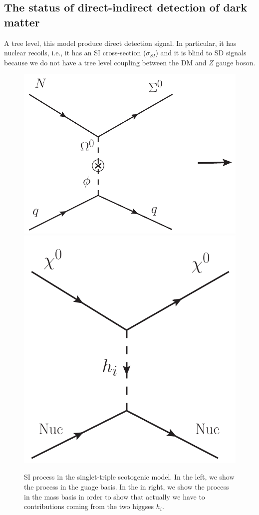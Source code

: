 \documentclass[12pt,letterpaper]{article}
\begin{document}
\subsection{The status of direct-indirect detection of dark matter }
\label{sec:indirect-direct-detection}
A tree level, this model produce direct detection signal. In particular, it has nuclear recoils, i.e., it has an SI cross-section ($\sigma_{SI}$) and it is blind to SD signals because we do not have a tree level coupling between the DM and $Z$ gauge boson. 
%
\begin{figure}
\begin{center}
\includegraphics[scale=0.35]{SI}
\includegraphics[scale=0.35]{SI-mass-basis}
\caption{SI process in the singlet-triple scotogenic model. In the left, we show the process in the guage basis. In the in right, we show the process in the mass basis in order to show that actually we have to contributions coming from the two higgses $h_i$.}
\label{fig:SI-diagram}
\end{center}
\end{figure}
\end{document}
